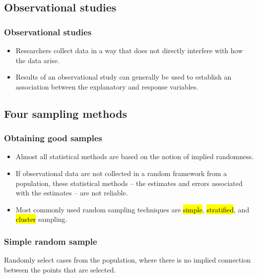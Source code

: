 \documentclass[slidestop,compress,mathserif]{beamer}
\begin{document}


\subsection{Observational studies}


\begin{frame}
	\frametitle{Observational studies}

	\begin{itemize}
		\item Researchers collect data in a way that does not directly interfere with how the data arise.
		\item Results of an observational study can generally be used to establish an association between the explanatory and response variables.
	\end{itemize}

\end{frame}


\subsection{Four sampling methods}


\begin{frame}
	\frametitle{Obtaining good samples}

	\begin{itemize}
		\item Almost all statistical methods are based on the notion of implied randomness. 
		\item If observational data are not collected in a random framework from a population, these statistical methods -- the estimates and errors associated with the estimates -- are not reliable.
		\item Most commonly used random sampling techniques are \hl{simple}, \hl{stratified}, and \hl{cluster} sampling.
	\end{itemize}

\end{frame}


\begin{frame}
	\frametitle{Simple random sample}

	Randomly select cases from the population, where there is no implied connection between the points that are selected.

	\begin{center}
	\end{center}

\end{frame}
\end{document}
